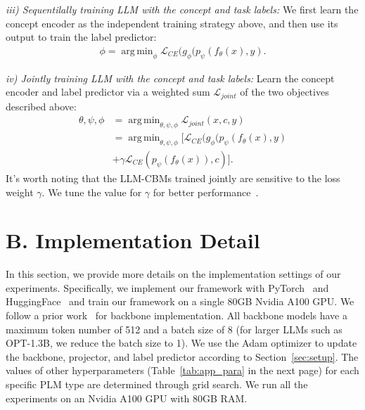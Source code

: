 \documentclass[letterpaper]{article} %
\DeclareMathOperator*{\argmin}{arg\,min}
\begin{document}
\noindent\textit{iii) Sequentilally training LLM with the concept and task labels:} We first learn the concept encoder as the independent training strategy above, and then use its output to train the label predictor:
\begin{equation*}
    \begin{aligned}
    \phi = \argmin_{\phi} \mathcal{L}_{CE} (g_{\phi}(p_\psi(f_\theta(x),y).
    \end{aligned}
\end{equation*}

\noindent\textit{iv) Jointly training LLM with the concept and task labels:} Learn the concept encoder and label predictor via a weighted sum $\mathcal{L}_{joint}$ of the two objectives described above:
\begin{equation*}
\begin{aligned}
    \theta, \psi, \phi &= \argmin_{\theta, \psi, \phi} \mathcal{L}_{joint}(x, c, y) \\ &= \argmin_{\theta, \psi, \phi} [\mathcal{L}_{CE} (g_{\phi}(p_\psi(f_\theta(x),y) \\ &+ \gamma \mathcal{L}_{CE} (p_\psi(f_\theta(x)),c)].
\end{aligned}
\end{equation*}
 It's worth noting that the LLM-CBMs trained jointly are sensitive to the loss weight $\gamma$. We tune the value for $\gamma$ for better performance~\citep{tan2023cbm}.

 \section{B. Implementation Detail}\label{app:implement}
 In this section, we provide more details on the implementation settings of our experiments. Specifically, we implement our framework with PyTorch~\cite{paszke2017automatic} and HuggingFace~\cite{wolf2020huggingfaces} and train our framework on a single 80GB Nvidia A100 GPU. We follow a prior work~\citep{abraham2022cebab} for backbone implementation. All backbone models have a maximum token number of 512 and a batch size of 8 (for larger LLMs such as OPT-1.3B, we reduce the batch size to 1). We use the Adam optimizer to update the backbone, projector, and label predictor according to Section~\ref{sec:setup}. The values of other hyperparameters (Table~\ref{tab:app_para} in the next page) for each specific PLM type are determined through grid search. We run all the experiments on an Nvidia A100 GPU with 80GB RAM.
\end{document}
